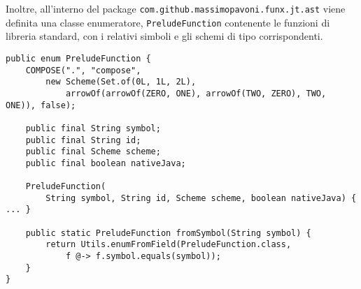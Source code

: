 Inoltre, all'interno del package \texttt{com.github.massimopavoni.funx.jt.ast} viene definita una classe enumeratore,
\texttt{PreludeFunction} contenente le funzioni di libreria standard, con i relativi simboli e gli schemi di tipo corrispondenti.

\vspace{4mm}
\begin{lstlisting}[caption={Parte del codice di \texttt{PreludeFunction}}, style=javaCode, label={lst:5-preludefunction-java}]
public enum PreludeFunction {
    COMPOSE(".", "compose",
        new Scheme(Set.of(0L, 1L, 2L),
            arrowOf(arrowOf(ZERO, ONE), arrowOf(TWO, ZERO), TWO, ONE)), false);

    public final String symbol;
    public final String id;
    public final Scheme scheme;
    public final boolean nativeJava;

    PreludeFunction(
        String symbol, String id, Scheme scheme, boolean nativeJava) { ... }

    public static PreludeFunction fromSymbol(String symbol) {
        return Utils.enumFromField(PreludeFunction.class,
            f @-> f.symbol.equals(symbol));
    }
}
\end{lstlisting}

\newpage

